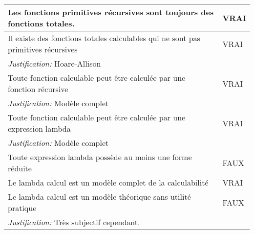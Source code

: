 \begin{longtable}{p{13cm}|l}
    Les fonctions primitives récursives sont toujours des fonctions totales.& VRAI \\
    \hline
    Il existe des fonctions totales calculables qui ne sont pas primitives récursives & VRAI \\
    \textit{Justification:} Hoare-Allison & \\
    \hline
    Toute fonction calculable peut être calculée par une fonction récursive& VRAI \\
    \textit{Justification:} Modèle complet & \\
    \hline
    Toute fonction calculable peut être calculée par une expression lambda& VRAI\\
    \textit{Justification:} Modèle complet & \\
    \hline
    Toute expression lambda possède au moins une forme réduite & FAUX \\
    \hline
    Le lambda calcul est un modèle complet de la calculabilité & VRAI \\
    \hline
    Le lambda calcul est un modèle théorique sans utilité pratique & FAUX \\
    \textit{Justification:} Très subjectif cependant.& \\

\end{longtable}
